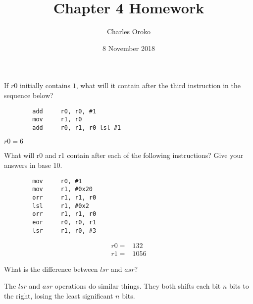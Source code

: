 \documentclass[12pt]{article}
\newenvironment{problem}[2][Problem]{\begin{trivlist}
\item[\hskip \labelsep {\bfseries #1}\hskip \labelsep {\bfseries #2.}]}{\end{trivlist}}
\begin{document}
 
 
\title{Chapter 4 Homework}%
\author{Charles Oroko} %
\date{8 November 2018}
\maketitle


\begin{problem}{4.1}
    If $r0$ initially contains $1$, what will it contain after the third instruction in the sequence below?
    \begin{verbatim}
        add     r0, r0, #1
        mov     r1, r0
        add     r0, r1, r0 lsl #1
    \end{verbatim}

\end{problem}

$r0=6$


\begin{problem}{4.2}
    What will r0 and r1 contain after each of the following instructions? Give your answers in base 10.
    \begin{verbatim}
        mov     r0, #1
        mov     r1, #0x20
        orr     r1, r1, r0
        lsl     r1, #0x2
        orr     r1, r1, r0
        eor     r0, r0, r1
        lsr     r1, r0, #3
    \end{verbatim}

\end{problem}

\begin{align*}
    r0 = & 132 \\
    r1 = & 1056
\end{align*}


\begin{problem}{4.3}
    What is the difference between $lsr$ and $asr$?
\end{problem}

The $lsr$ and $asr$ operations do similar things. They both shifts each bit $n$ bits to the right, losing the least significant $n$ bits.
\end{document}
